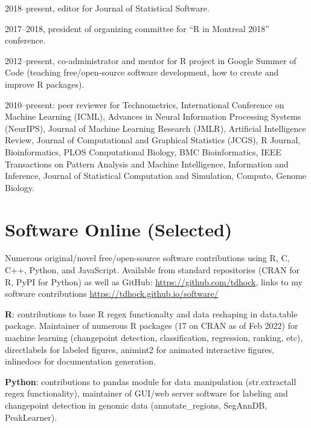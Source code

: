 \documentclass[margin,line]{res}
\begin{document}
\begin{resume}
2018--present, editor for Journal of Statistical Software.

2017--2018, president of organizing committee for ``R in Montreal
2018'' conference.

2012--present, co-administrator and mentor for R project in Google
Summer of Code (teaching free/open-source software development, how to
create and improve R packages).

2010--present: peer reviewer for Technometrics, International
Conference on Machine Learning (ICML), Advances in Neural Information
Processing Systems (NeurIPS), Journal of Machine Learning Research
(JMLR), Artificial Intelligence Review, Journal of Computational and
Graphical Statistics (JCGS), R Journal, Bioinformatics, PLOS
Computational Biology, BMC Bioinformatics, IEEE Transactions on
Pattern Analysis and Machine Intelligence, Information and Inference,
Journal of Statistical Computation and Simulation, Computo, Genome
Biology.

\section{\sc Software Online (Selected)} 

Numerous original/novel free/open-source software contributions using R, C, C++,
Python, and JavaScript. Available from standard repositories (CRAN for
R, PyPI for Python) as well as GitHub:
\url{https://github.com/tdhock}, links to my software contributions
\url{https://tdhock.github.io/software/}

{\bf R}: contributions to base R regex functionalty and data reshaping
in data.table package. Maintainer of numerous R packages (17 on CRAN
as of Feb 2022) for machine learning (changepoint detection,
classification, regression, ranking, etc), directlabels for labeled
figures, animint2 for animated interactive figures, inlinedocs for
documentation generation.

{\bf Python}: contributions to pandas module for data manipulation
(str.extractall regex functionality), maintainer of GUI/web server
software for labeling and changepoint detection in genomic data
(annotate\_regions, SegAnnDB, PeakLearner).



\end{resume}
\end{document}
